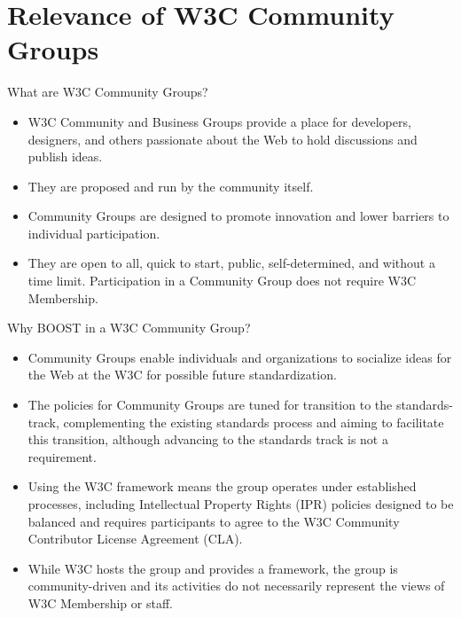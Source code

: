\documentclass[presentation]{beamer}
\begin{document}
\section{Relevance of W3C Community Groups}
\label{relevance-of-w3c-community-groups}
\begin{frame}[label={sec:orgaa59b5c}]{What are W3C Community Groups?}
\begin{itemize}
\item W3C Community and Business Groups provide a place for developers, designers, and others passionate about the Web to hold discussions and publish ideas.
\item They are proposed and run by the community itself.
\item Community Groups are designed to promote innovation and lower barriers to individual participation.
\item They are open to all, quick to start, public, self-determined, and without a time limit. Participation in a Community Group does not require W3C Membership.
\end{itemize}
\end{frame}
\begin{frame}[label={sec:org4965300}]{Why BOOST in a W3C Community Group?}
\begin{itemize}
\item Community Groups enable individuals and organizations to socialize ideas for the Web at the W3C for possible future standardization.
\item The policies for Community Groups are \alert{tuned for transition to the standards-track}, complementing the existing standards process and aiming to facilitate this transition, although advancing to the standards track is not a requirement.
\item Using the W3C framework means the group operates under established processes, including Intellectual Property Rights (IPR) policies designed to be balanced and requires participants to agree to the W3C Community Contributor License Agreement (CLA).
\item While W3C hosts the group and provides a framework, the group is community-driven and its activities do not necessarily represent the views of W3C Membership or staff.
\end{itemize}
\end{frame}
\end{document}
